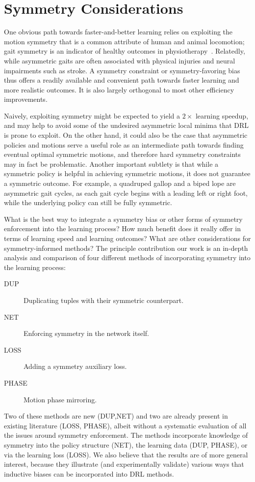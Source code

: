 \chapter{Symmetry Considerations}
\label{ch:symmetry}



One obvious path towards faster-and-better learning relies on exploiting the motion symmetry
that is a common attribute of human and animal locomotion;
gait symmetry is an indicator of healthy outcomes in 
physiotherapy~\citep{robinson1987use, riskowski}.
Relatedly, while asymmetric gaits are often associated 
with physical injuries and neural impairments such as stroke.  
A symmetry constraint or symmetry-favoring bias thus offers a readily available and convenient 
path towards faster learning and more realistic outcomes. 
It is also largely orthogonal to most other efficiency improvements.

Naively, exploiting symmetry might be expected to yield a $2\times$ learning speedup, and may help to avoid
some of the undesired asymmetric local minima that \ac{DRL} is prone to exploit.  On the other hand,
it could also be the case that asymmetric policies and motions serve a useful role as an intermediate path 
towards finding eventual optimal symmetric motions, and therefore
hard symmetry constraints may in fact be problematic.
Another important subtlety is that while a symmetric policy is helpful in achieving symmetric motions,
it does not guarantee a symmetric outcome.
For example, a quadruped gallop and a biped lope are asymmetric gait cycles, 
as each gait cycle begins with a leading left or right foot, while the underlying 
policy can still be fully symmetric.

What is the best way to integrate a symmetry bias or other forms of symmetry enforcement into the learning process?
How much benefit does it really offer in terms of learning speed and learning outcomes?
What are other considerations for symmetry-informed methods?
The principle contribution our work is an in-depth analysis and comparison of four different methods
of incorporating symmetry into the learning process:
\begin{description}
\item [DUP]  Duplicating tuples with their symmetric counterpart.
\item [NET]  Enforcing symmetry in the network itself.
\item [LOSS] Adding a symmetry auxiliary loss.
\item [PHASE] Motion phase mirroring.
\end{description}
Two of these methods are new (DUP,NET) and two are already present in existing literature (LOSS, PHASE), 
albeit without a systematic evaluation of all the issues around symmetry enforcement. 
The methods incorporate knowledge of symmetry into the policy structure (NET), 
the learning data (DUP, PHASE), or via the learning loss (LOSS). 
We also believe that the results are of more general interest, because they 
illustrate (and experimentally validate) various ways that inductive biases 
can be incorporated into \ac{DRL} methods.

